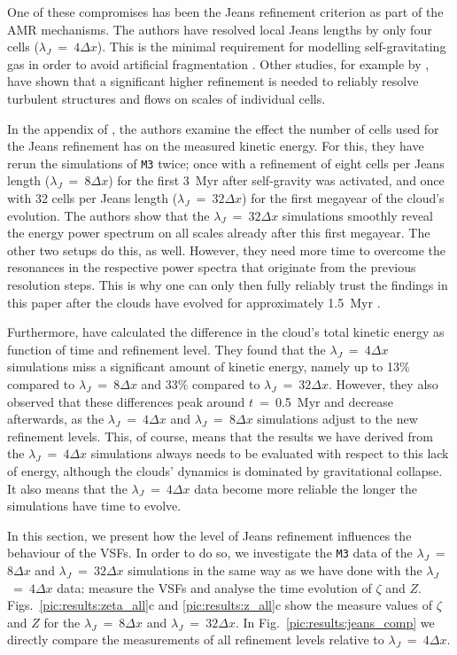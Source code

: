 One of these compromises has been the Jeans refinement criterion as part of the AMR mechanisms.
The authors have resolved local Jeans lengths by only four cells ($\lambda_J$~=~$4\Delta{}x$).
This is the minimal requirement for modelling self-gravitating gas in order to avoid artificial fragmentation \citep{Truelove1998}. 
Other studies, for example by \citet{Turk2012}, have shown that a significant higher refinement is needed to reliably resolve turbulent structures and flows on scales of individual cells.

In the appendix of , the authors examine the effect the number of cells used for the Jeans refinement has on the measured kinetic energy.
For this, they have rerun the simulations of \texttt{M3} twice; 
once with a refinement of eight cells per Jeans length ($\lambda_J$~=~$8\Delta{}x$) for the first 3~Myr after self-gravity was activated, and once with 32 cells per Jeans length ($\lambda_J$~=~$32\Delta{}x$) for the first megayear of the cloud's evolution.
The authors show that the $\lambda_J$~=~$32\Delta{}x$ simulations smoothly reveal the energy power spectrum on all scales already after this first megayear.
The other two setups do this, as well.
However, they need more time to overcome the resonances in the respective power spectra that originate from the previous resolution steps. 
This is why one can only then fully reliably trust the findings in this paper after the clouds have evolved for approximately 1.5~Myr \citep[see also][]{IbanezMejia2017,Seifried2017b}.

Furthermore,  have calculated the difference in the cloud's total kinetic energy as function of time and refinement level.
They found that the $\lambda_J$~=~$4\Delta{}x$ simulations miss a significant amount of kinetic energy, namely up to 13\% compared to $\lambda_J$~=~$8\Delta{}x$ and 33\% compared to $\lambda_J$~=~$32\Delta{}x$.
However, they also observed that these differences peak around $t$~=~0.5~Myr and decrease afterwards, as the $\lambda_J$~=~$4\Delta{}x$ and $\lambda_J$~=~$8\Delta{}x$ simulations adjust to the new refinement levels.
This, of course, means that the results we have derived from the $\lambda_J$~=~$4\Delta{}x$ simulations always needs to be evaluated with respect to this lack of energy, although the clouds' dynamics is dominated by gravitational collapse.
It also means that the $\lambda_J$~=~$4\Delta{}x$ data become more reliable the longer the simulations have time to evolve.

In this section, we present how the level of Jeans refinement influences the behaviour of the VSFs.
In order to do so, we investigate the \texttt{M3} data of the $\lambda_J$~=~$8\Delta{}x$ and $\lambda_J$~=~$32\Delta{}x$ simulations in the same way as we have done with the $\lambda_J$~=~$4\Delta{}x$ data: measure the VSFs and analyse the time evolution of $\zeta$ and $Z$.
Figs.~\ref{pic:results:zeta_all}c and \ref{pic:results:z_all}c show the measure values of $\zeta$ and $Z$ for the $\lambda_J$~=~$8\Delta{}x$ and $\lambda_J$~=~$32\Delta{}x$.
In Fig.~\ref{pic:results:jeans_comp} we directly compare the measurements of all refinement levels relative to $\lambda_J$~=~$4\Delta{}x$.

